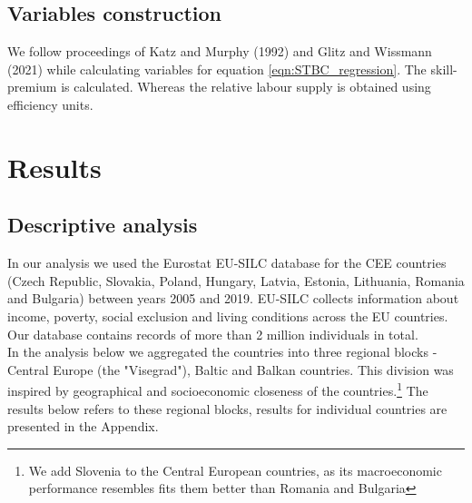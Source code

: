 \documentclass{article}
\begin{document}
\subsection{Variables construction}
We follow proceedings of Katz and Murphy (1992) and Glitz and Wissmann (2021) while calculating variables for equation \ref{eqn:STBC_regression}. The skill-premium is calculated. Whereas the relative labour supply is obtained using efficiency units.


\section{Results}
\subsection{Descriptive analysis}
In our analysis we used the Eurostat EU-SILC database for the CEE countries (Czech Republic, Slovakia, Poland, Hungary, Latvia, Estonia, Lithuania, Romania and Bulgaria) between years 2005 and 2019. EU-SILC collects information about income, poverty, social exclusion and living conditions across the EU countries. Our database contains records of more than 2 million individuals in total.\\ In the analysis below we aggregated the countries into three regional blocks - Central Europe (the "Visegrad"), Baltic and Balkan countries. This division was inspired by geographical and socioeconomic closeness of the countries.\footnote{We add Slovenia to the Central European countries, as its macroeconomic performance resembles fits them better than Romania and Bulgaria} %
The results below refers to these regional blocks, results for individual countries are presented in the Appendix.
\end{document}
